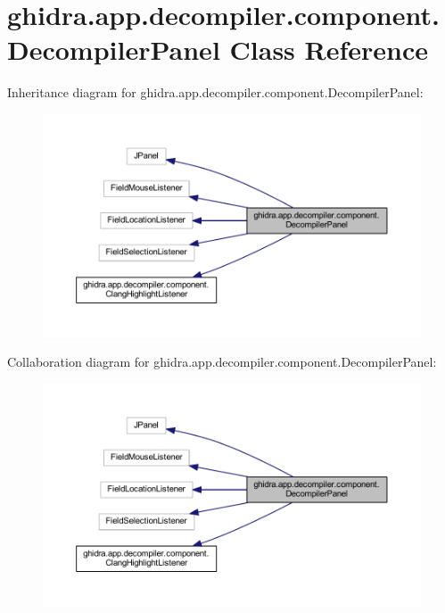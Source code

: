 \hypertarget{classghidra_1_1app_1_1decompiler_1_1component_1_1_decompiler_panel}{}\section{ghidra.\+app.\+decompiler.\+component.\+Decompiler\+Panel Class Reference}
\label{classghidra_1_1app_1_1decompiler_1_1component_1_1_decompiler_panel}


Inheritance diagram for ghidra.\+app.\+decompiler.\+component.\+Decompiler\+Panel\+:
\nopagebreak
\begin{figure}[H]
\begin{center}
\leavevmode
\includegraphics[width=350pt]{classghidra_1_1app_1_1decompiler_1_1component_1_1_decompiler_panel__inherit__graph}
\end{center}
\end{figure}


Collaboration diagram for ghidra.\+app.\+decompiler.\+component.\+Decompiler\+Panel\+:
\nopagebreak
\begin{figure}[H]
\begin{center}
\leavevmode
\includegraphics[width=350pt]{classghidra_1_1app_1_1decompiler_1_1component_1_1_decompiler_panel__coll__graph}
\end{center}
\end{figure}
